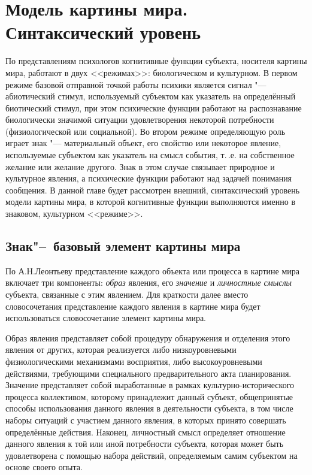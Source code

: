 \chapter{Модель картины мира. Синтаксический уровень} \label{chapt2}

По представлениям психологов \cite{Chudova2012,Chudova2014} когнитивные функции субъекта, носителя картины мира, работают в двух <<режимах>>: биологическом и культурном. В первом режиме базовой отправной точкой работы психики является сигнал "--- абиотический стимул, используемый субъектом как указатель на определённый биотический стимул, при этом психические функции работают на распознавание биологически значимой ситуации удовлетворения некоторой потребности (физиологической или социальной). Во втором режиме определяющую роль играет знак "--- материальный объект, его свойство или некоторое явление, используемые субъектом как указатель на смысл события, т.\,.е. на собственное желание или желание другого. Знак в этом случае связывает природное и культурное явления, а психические функции работают над задачей понимания сообщения. В данной главе будет рассмотрен внешний, синтаксический уровень модели картины мира, в которой когнитивные функции выполняются именно в знаковом, культурном <<режиме>>.

\section{Знак"--~базовый элемент картины мира} \label{sect2_1}

По А.Н.Леонтьеву \cite{Leontiev1975} представление каждого объекта или процесса в картине мира включает три компоненты: \textit{образ} явления, его \textit{значение} и \textit{личностные смыслы} субъекта, связанные с этим явлением. Для краткости далее вместо словосочетания представление каждого явления в картине мира будет использоваться словосочетание элемент картины мира.

Образ явления представляет собой процедуру обнаружения и отделения этого явления от других, которая реализуется либо низкоуровневыми физиологическими механизмами восприятия, либо высокоуровневыми действиями, требующими специального предварительного акта планирования. Значение представляет собой выработанные в рамках культурно-исторического процесса коллективом, которому принадлежит данный субъект, общепринятые способы использования данного явления в деятельности субъекта, в том числе наборы ситуаций с участием данного явления, в которых принято совершать определённые действия. Наконец, личностный смысл определяет отношение данного явления к той или иной потребности субъекта, которая может быть удовлетворена с помощью набора действий, определяемым самим субъектом на основе своего опыта.

